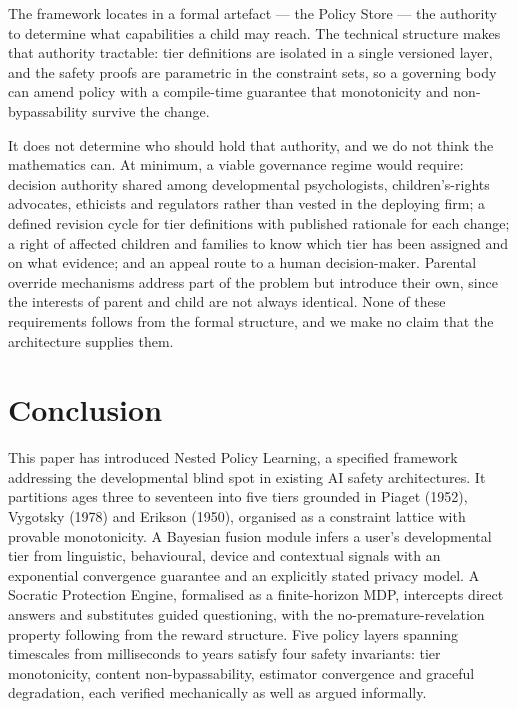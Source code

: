 \documentclass[fleqn,10pt]{wlscirep}
\begin{document}
The framework locates in a formal artefact --- the Policy Store --- the authority to determine what capabilities a child may reach. The technical structure makes that authority tractable: tier definitions are isolated in a single versioned layer, and the safety proofs are parametric in the constraint sets, so a governing body can amend policy with a compile-time guarantee that monotonicity and non-bypassability survive the change.

It does not determine who should hold that authority, and we do not think the mathematics can. At minimum, a viable governance regime would require: decision authority shared among developmental psychologists, children's-rights advocates, ethicists and regulators rather than vested in the deploying firm; a defined revision cycle for tier definitions with published rationale for each change; a right of affected children and families to know which tier has been assigned and on what evidence; and an appeal route to a human decision-maker. Parental override mechanisms address part of the problem but introduce their own, since the interests of parent and child are not always identical. None of these requirements follows from the formal structure, and we make no claim that the architecture supplies them.

\section*{Conclusion}

This paper has introduced Nested Policy Learning, a specified framework addressing the developmental blind spot in existing AI safety architectures. It partitions ages three to seventeen into five tiers grounded in Piaget (1952)\cite{Piaget1952}, Vygotsky (1978)\cite{Vygotsky1978} and Erikson (1950)\cite{Erikson1950}, organised as a constraint lattice with provable monotonicity. A Bayesian fusion module infers a user's developmental tier from linguistic, behavioural, device and contextual signals with an exponential convergence guarantee and an explicitly stated privacy model. A Socratic Protection Engine, formalised as a finite-horizon MDP, intercepts direct answers and substitutes guided questioning, with the no-premature-revelation property following from the reward structure. Five policy layers spanning timescales from milliseconds to years satisfy four safety invariants: tier monotonicity, content non-bypassability, estimator convergence and graceful degradation, each verified mechanically as well as argued informally.
\end{document}
